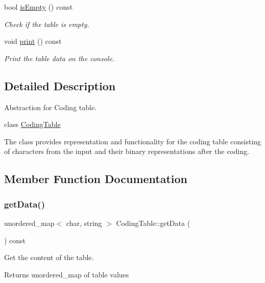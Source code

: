 \begin{DoxyCompactItemize}
bool \mbox{\hyperlink{class_coding_table_a48c523f7f362f31cef5da3385b1e1198}{is\+Empty}} () const
\begin{DoxyCompactList}\small\item\em Check if the table is empty. \end{DoxyCompactList}\item 
\mbox{\label{class_coding_table_a648a57cf74a5ee174a56ea1981cabdb4}} 
void \mbox{\hyperlink{class_coding_table_a648a57cf74a5ee174a56ea1981cabdb4}{print}} () const
\begin{DoxyCompactList}\small\item\em Print the table data on the console. \end{DoxyCompactList}\end{DoxyCompactItemize}


\subsection{Detailed Description}
Abstraction for Coding table. 

class \mbox{\hyperlink{class_coding_table}{Coding\+Table}}

The class provides representation and functionality for the coding table consisting of characters from the input and their binary representations after the coding. 

\subsection{Member Function Documentation}
\mbox{\label{class_coding_table_af896cb49760b28f88dcc3524f4972058}} 
\subsubsection{\texorpdfstring{getData()}{getData()}}
{\footnotesize\ttfamily unordered\+\_\+map$<$ char, string $>$ Coding\+Table\+::get\+Data (\begin{DoxyParamCaption}{ }\end{DoxyParamCaption}) const}



Get the content of the table. 

\begin{DoxyReturn}{Returns}
unordered\+\_\+map of table values 
\end{DoxyReturn}
\mbox{\label{class_coding_table_a48c523f7f362f31cef5da3385b1e1198}} 
